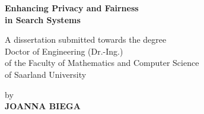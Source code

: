 
\frontmatter%
\begin{titlepage}

\def\docdate{2018}

\newlength{\longskip}
\setlength{\longskip}{0.03\textheight}

\rmfamily
{}

\begin{center}

\hrulefill\par
\huge{
    \vspace{0.5cm}
 \textbf{Enhancing Privacy and Fairness \\in Search Systems} \\
      }
\hrulefill\par
{}



\Large
A dissertation submitted towards the degree \\
Doctor of Engineering (Dr.-Ing.) \\
of the Faculty of Mathematics and Computer Science \\
of Saarland University


by \\
\textbf{JOANNA BIEGA}%


\end{center}
\end{titlepage}
